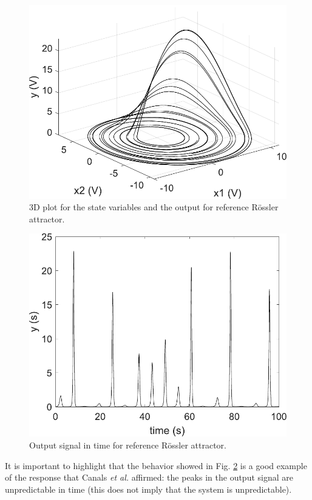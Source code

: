 	\begin{figure}[H]
	    \centering
	    \includegraphics[scale=0.48]{figs/OriginalRosslerAttractor3d.pdf}
	    \caption{3D plot for the state variables and the output for reference Rössler attractor.}
	    \label{fig:3DRosslerO}
	\end{figure}
	\begin{figure}
	    \centering
	    \includegraphics[scale=0.38]{figs/OriginalRosslery.pdf}
	    \caption{Output signal in time for reference Rössler attractor.}
	    \label{fig:RosslerO}
	\end{figure}
    It is important to highlight that the behavior showed in Fig. \ref{fig:RosslerO} is a good example of the response that Canals \textit{et al.} \cite{canals2014random} affirmed: the peaks in the output signal are unpredictable in time (this does not imply that the system is unpredictable).
	
